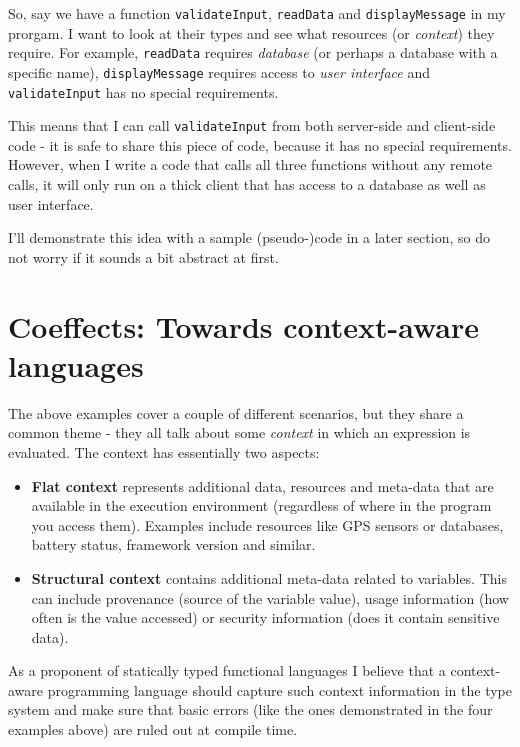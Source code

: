 So, say we have a function \texttt{validateInput}, \texttt{readData} and \texttt{displayMessage} in my prorgam.
I want to look at their types and see what resources (or \emph{context}) they require. For example,
\texttt{readData} requires \emph{database} (or perhaps a database with a specific name), \texttt{displayMessage} 
requires access to \emph{user interface} and \texttt{validateInput} has no special requirements.

This means that I can call \texttt{validateInput} from both server-side and client-side code - it is
safe to share this piece of code, because it has no special requirements. However, when I write
a code that calls all three functions without any remote calls, it will only run on a thick
client that has access to a database as well as user interface.

I'll demonstrate this idea with a sample (pseudo-)code in a later section, so do not worry if
it sounds a bit abstract at first.



\section{Coeffects: Towards context-aware languages}

The above examples cover a couple of different scenarios, but they share a common theme - 
they all talk about some \emph{context} in which an expression is evaluated. The context has 
essentially two aspects:

\begin{itemize}
\item \textbf{Flat context} represents additional data, resources and meta-data that are 
   available in the execution environment (regardless of where in the program you 
   access them). Examples include resources like GPS sensors or databases, battery status,
   framework version and similar. 

\item \textbf{Structural context} contains additional meta-data related to variables. This can include
   provenance (source of the variable value), usage information (how often is the value
   accessed) or security information (does it contain sensitive data). 
\end{itemize}

As a proponent of statically typed functional languages I believe that a context-aware 
programming language should capture such context information in the type system and make
sure that basic errors (like the ones demonstrated in the four examples above) are ruled
out at compile time.  

